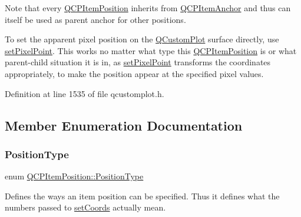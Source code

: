 Note that every \hyperlink{class_q_c_p_item_position}{Q\+C\+P\+Item\+Position} inherits from \hyperlink{class_q_c_p_item_anchor}{Q\+C\+P\+Item\+Anchor} and thus can itself be used as parent anchor for other positions.

To set the apparent pixel position on the \hyperlink{class_q_custom_plot}{Q\+Custom\+Plot} surface directly, use \hyperlink{class_q_c_p_item_position_ab404e56d9ac2ac2df0382c57933a71ef}{set\+Pixel\+Point}. This works no matter what type this \hyperlink{class_q_c_p_item_position}{Q\+C\+P\+Item\+Position} is or what parent-\/child situation it is in, as \hyperlink{class_q_c_p_item_position_ab404e56d9ac2ac2df0382c57933a71ef}{set\+Pixel\+Point} transforms the coordinates appropriately, to make the position appear at the specified pixel values. 

Definition at line 1535 of file qcustomplot.\+h.



\subsection{Member Enumeration Documentation}
\mbox{\label{class_q_c_p_item_position_aad9936c22bf43e3d358552f6e86dbdc8}} 
\subsubsection{\texorpdfstring{Position\+Type}{PositionType}}
{\footnotesize\ttfamily enum \hyperlink{class_q_c_p_item_position_aad9936c22bf43e3d358552f6e86dbdc8}{Q\+C\+P\+Item\+Position\+::\+Position\+Type}}

Defines the ways an item position can be specified. Thus it defines what the numbers passed to \hyperlink{class_q_c_p_item_position_aa988ba4e87ab684c9021017dcaba945f}{set\+Coords} actually mean.

